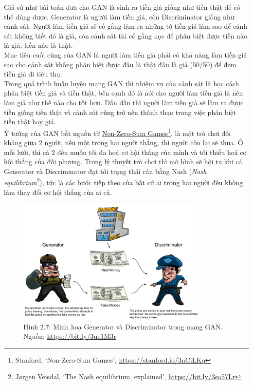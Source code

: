 \documentclass[a4paper]{article}
\begin{document}
\noindent
Giả sử như bài toán đưa cho GAN là sinh ra tiền giả giống như tiền thật để có thể dùng được, Generator là người làm tiền giả, còn Discriminator giống như cảnh sát. Người làm tiền giả sẽ cố gắng làm ra những tờ tiền giả làm sao để cảnh sát không biết đó là giả, còn cảnh sát thì cố gắng học để phân biệt được tiền nào là giả, tiền nào là thật.\\
Mục tiêu cuối cùng của GAN là người làm tiền giả phải có khả năng làm tiền giả sao cho cảnh sát không phân biệt được đâu là thật đâu là giả (50/50) để đem tiền giả đi tiêu thụ.\\
Trong quá trình huấn luyện mạng GAN thì nhiệm vụ của cảnh sát là học cách phân biệt tiền giả và tiền thật, bên cạnh đó là nói cho người làm tiền giả là nên làm giả như thế nào cho tốt hơn. Dần dần thì người làm tiền giả sẽ làm ra được tiền giống tiền thật và cảnh sát cũng trở nên thành thạo trong việc phân biệt tiền thật hay giả.\\

\noindent
Ý tưởng của GAN bắt nguồn từ \href{https://cs.stanford.edu/people/eroberts/courses/soco/projects/1998-99/game-theory/nonzero.html}{Non-Zero-Sum Games}\footnote{Stanford, \lq Non-Zero-Sum Games\rq, \href{https://stanford.io/3nCiLKq}{https://stanford.io/3nCiLKq}}, là một trò chơi đối kháng giữa 2 người, nếu một trong hai người thắng, thì người còn lại sẽ thua. Ở mỗi lười, thì cả 2 đều muốn tối đa hoá cơ hội thắng của mình và tối thiểu hoá cơ hội thắng của đối phương. Trong lý thuyết trò chơi thì mô hình sẽ hội tụ khi cả Generator và Discriminator đạt tới trạng thái cân bằng Nash (\textit{Nash equilibrium}\footnote{Jørgen Veisdal, \lq The Nash equilibrium, explained\rq, \href{https://bit.ly/3ea57Lr}{https://bit.ly/3ea57Lr}}), tức là các bước tiếp theo của bất cứ ai trong hai người đều không làm thay đổi cơ hội thẳng của ai cả.

\begin{figure}[h!]
\centering
\includegraphics[width=9.5cm]{images/2_7.png}
\caption{Hình 2.7: Minh hoạ Generator và Discriminator trong mạng GAN. Nguồn: \href{https://bit.ly/3ue1M3r}{https://bit.ly/3ue1M3r}}
\end{figure}
\end{document}

